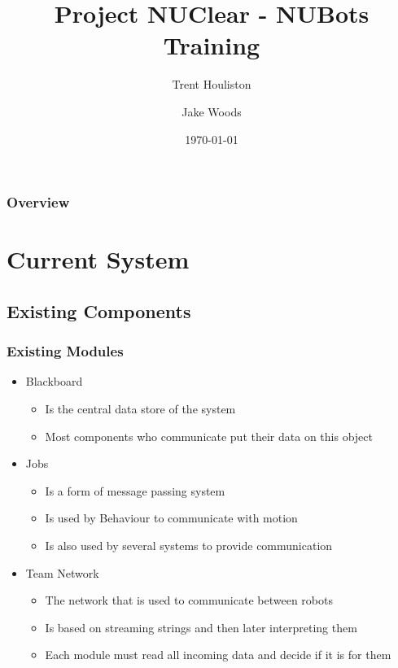 \documentclass{beamer}
\title[Short title]{Project NUClear - NUBots Training}
\author{
	Trent Houliston \and Jake Woods
}
\institute[UoN]
{
	University of Newcastle \\ %
	\medskip
	\textit{Trent.Houliston@uon.edu.au, Jake.f.woods@gmail.com} %
}
\date{\today}
\begin{document}
\begin{frame}
	\titlepage %
\end{frame}


\begin{frame}
	\frametitle{Overview}
	\tableofcontents
\end{frame}

\section{Current System}
\subsection{Existing Components}
\begin{frame}
	\frametitle{Existing Modules}
	\begin{itemize}
		\item Blackboard
			\begin{itemize}
				\item Is the central data store of the system
				\item Most components who communicate put their data on this object
			\end{itemize}
		\item Jobs
			\begin{itemize}
				\item Is a form of message passing system
				\item Is used by Behaviour to communicate with motion
				\item Is also used by several systems to provide communication
			\end{itemize}
		\item Team Network
			\begin{itemize}
				\item The network that is used to communicate between robots
				\item Is based on streaming strings and then later interpreting them
				\item Each module must read all incoming data and decide if it is for them
			\end{itemize}
	\end{itemize}
\end{frame}
\end{document}

